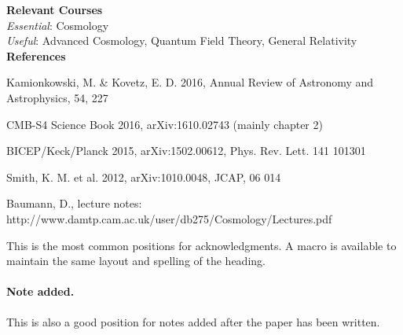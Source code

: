 \documentclass[a4paper,10pt]{article}
\begin{document}
\textbf{Relevant Courses}\\

\textit{Essential}: Cosmology\\

\textit{Useful}: Advanced Cosmology, Quantum Field Theory, General Relativity\\

\textbf{References}
\begin{enumerate}[label={[\arabic*]}]
\item {Kamionkowski, M. \& Kovetz, E. D. 2016, Annual Review of Astronomy and Astrophysics,
54, 227}
\item {CMB-S4 Science Book 2016, arXiv:1610.02743 (mainly chapter 2)}
\item {BICEP/Keck/Planck 2015, arXiv:1502.00612, Phys. Rev. Lett. 141 101301}
\item {Smith, K. M. et al. 2012, arXiv:1010.0048, JCAP, 06 014}
\item {Baumann, D., lecture notes: http://www.damtp.cam.ac.uk/user/db275/Cosmology/Lectures.pdf}
\end{enumerate}













\acknowledgments

This is the most common positions for acknowledgments. A macro is
available to maintain the same layout and spelling of the heading.

\paragraph{Note added.} This is also a good position for notes added
after the paper has been written.



\end{document}
